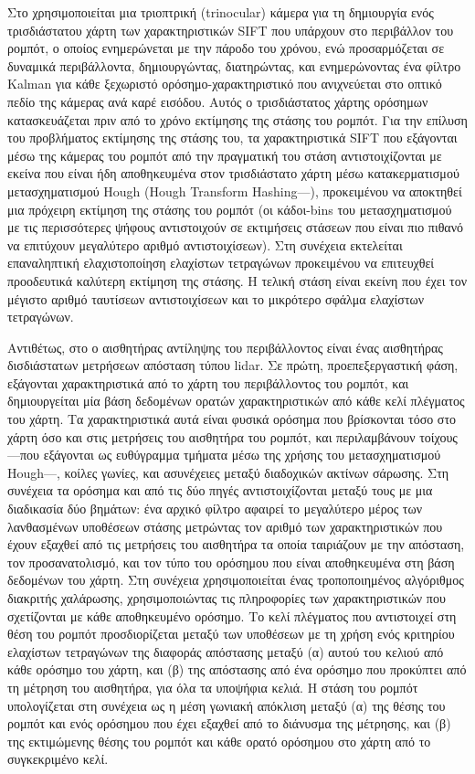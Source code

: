 Στο \cite{Se} χρησιμοποιείται μια τριοπτρική (trinocular) κάμερα για τη
δημιουργία ενός τρισδιάστατου χάρτη των χαρακτηριστικών SIFT που υπάρχουν στο
περιβάλλον του ρομπότ, ο οποίος ενημερώνεται με την πάροδο του χρόνου, ενώ
προσαρμόζεται σε δυναμικά περιβάλλοντα, δημιουργώντας, διατηρώντας, και
ενημερώνοντας ένα φίλτρο Kalman για κάθε ξεχωριστό ορόσημο-χαρακτηριστικό που
ανιχνεύεται στο οπτικό πεδίο της κάμερας ανά καρέ εισόδου. Αυτός ο
τρισδιάστατος χάρτης ορόσημων κατασκευάζεται πριν από το χρόνο εκτίμησης της
στάσης του ρομπότ. Για την επίλυση του προβλήματος εκτίμησης της στάσης του, τα
χαρακτηριστικά SIFT που εξάγονται μέσω της κάμερας του ρομπότ από την πραγματική
του στάση αντιστοιχίζονται με εκείνα που είναι ήδη αποθηκευμένα στον τρισδιάστατο
χάρτη μέσω κατακερματισμού μετασχηματισμού Hough (Hough Transform
Hashing---\cite{Hough1960}), προκειμένου να αποκτηθεί μια πρόχειρη εκτίμηση της
στάσης του ρομπότ (οι κάδοι-bins του μετασχηματισμού με τις περισσότερες ψήφους
αντιστοιχούν σε εκτιμήσεις στάσεων που είναι πιο πιθανό να επιτύχουν μεγαλύτερο
αριθμό αντιστοιχίσεων). Στη συνέχεια εκτελείται επαναληπτική ελαχιστοποίηση
ελαχίστων τετραγώνων προκειμένου να επιτευχθεί προοδευτικά καλύτερη εκτίμηση
της στάσης. Η τελική στάση είναι εκείνη που έχει τον μέγιστο αριθμό ταυτίσεων
αντιστοιχίσεων και το μικρότερο σφάλμα ελαχίστων τετραγώνων.

Αντιθέτως, στο \cite{Hernandez-alamilla2006} ο αισθητήρας αντίληψης του
περιβάλλοντος είναι ένας αισθητήρας δισδιάστατων μετρήσεων απόσταση τύπου
lidar. Σε πρώτη, προεπεξεργαστική φάση, εξάγονται χαρακτηριστικά από το χάρτη
του περιβάλλοντος του ρομπότ, και δημιουργείται μία βάση δεδομένων ορατών
χαρακτηριστικών από κάθε κελί πλέγματος του χάρτη. Τα χαρακτηριστικά αυτά είναι
φυσικά ορόσημα που βρίσκονται τόσο στο χάρτη όσο και στις μετρήσεις του
αισθητήρα του ρομπότ, και περιλαμβάνουν τοίχους---που εξάγονται ως ευθύγραμμα
τμήματα μέσω της χρήσης του μετασχηματισμού Hough---, κοίλες γωνίες, και
ασυνέχειες μεταξύ διαδοχικών ακτίνων σάρωσης. Στη συνέχεια τα ορόσημα και από
τις δύο πηγές αντιστοιχίζονται μεταξύ τους με μια διαδικασία δύο βημάτων: ένα
αρχικό φίλτρο αφαιρεί το μεγαλύτερο μέρος των λανθασμένων υποθέσεων στάσης
μετρώντας τον αριθμό των χαρακτηριστικών που έχουν εξαχθεί από τις μετρήσεις
του αισθητήρα τα οποία ταιριάζουν με την απόσταση, τον προσανατολισμό, και τον
τύπο του ορόσημου που είναι αποθηκευμένα στη βάση δεδομένων του χάρτη. Στη
συνέχεια χρησιμοποιείται ένας τροποποιημένος αλγόριθμος διακριτής χαλάρωσης,
χρησιμοποιώντας τις πληροφορίες των χαρακτηριστικών που σχετίζονται με κάθε
αποθηκευμένο ορόσημο. Το κελί πλέγματος που αντιστοιχεί στη θέση του ρομπότ
προσδιορίζεται μεταξύ των υποθέσεων με τη χρήση ενός κριτηρίου ελαχίστων
τετραγώνων της διαφοράς απόστασης μεταξύ (α) αυτού του κελιού από κάθε ορόσημο
του χάρτη, και (β) της απόστασης από ένα ορόσημο που προκύπτει από τη μέτρηση
του αισθητήρα, για όλα τα υποψήφια κελιά.  Η στάση του ρομπότ υπολογίζεται στη
συνέχεια ως η μέση γωνιακή απόκλιση μεταξύ (α) της θέσης του ρομπότ και ενός
ορόσημου που έχει εξαχθεί από το διάνυσμα της μέτρησης, και (β) της εκτιμώμενης
θέσης του ρομπότ και κάθε ορατό ορόσημου στο χάρτη από το συγκεκριμένο κελί.

